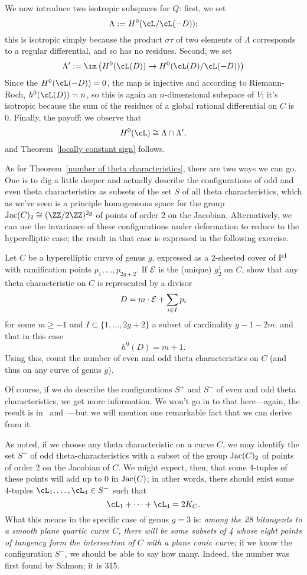 We now introduce two isotropic subspaces for $Q$: first, we set
$$
\Lambda := H^0( \cL / \cL(-D) );
$$
this is isotropic simply because the product $\sigma\tau$ of two elements of $\Lambda$ corresponds to a regular differential, and so has no residues. Second, we set
$$
\Lambda' := \im\left( H^0(\cL(D)) \to H^0( \cL(D) / \cL(-D) ) \right)
$$
Since the $H^0(\cL(-D)) = 0$, the map is injective and according to Riemann-Roch, $h^0(\cL(D)) = n$, so this is again an $n$-dimensional subspace of $V$; it's isotropic because the sum of the residues of a global rational differential on $C$ is 0. Finally, the payoff: we observe that
$$
H^0(\cL) \cong \Lambda \cap \Lambda',
$$
and Theorem~\ref{locally constant sign} follows.

As for Theorem~\ref{number of theta characteristics}, there are two ways we can go. One is to dig a little deeper and actually describe the configurations of odd and even theta characteristics as subsets of the set $S$ of all theta characteristics, which as we've seen is a principle homogeneous space for the group $\Jac(C)_2 \cong (\ZZ/2\ZZ)^{2g}$ of points of order 2 on the Jacobian. Alternatively, we can use the invariance of these configurations under deformation to reduce to the hyperelliptic case; the result in that case is expressed in the following exercise.

\begin{exercise}
Let $C$ be a hyperelliptic curve of genus $g$, expressed as a 2-sheeted cover of $\PP^1$ with ramification points $p_1,\dots,p_{2g+2}$. If $\cE$ is the (unique) $g^1_2$ on $C$, show that any theta characteristic on $C$ is represented by a divisor
$$
D = m\cdot \cE + \sum_{i \in I} p_i
$$
for some $m \geq -1$ and $I \subset \{1,\dots, 2g+2\}$ a subset of cardinality $g-1-2m$; and that in this case
$$
h^0(D) = m+1.
$$
Using this, count the number of even and odd theta characteristics on $C$ (and thus on any curve of genus $g$).
\end{exercise}

Of course, if we do describe the configurations $S^+$ and $S^-$ of even and odd theta characteristics, we get more information. We won't go in to that here---again, the result is in~\cite{MumfordPaper} and~\cite{JHPaper}---but we will mention one remarkable fact that we can derive from it.

As noted, if we choose any theta characteristic on a curve $C$, we may identify the set $S^-$ of odd theta-characteristics with a subset of the group $\Jac(C)_2$ of points of order 2 on the Jacobian of $C$. We might expect, then, that some 4-tuples of these points will add up to 0 in $\Jac(C)$; in other words, there should exist some 4-tuples $\cL_1,\dots,\cL_4 \in S^-$ such that
$$
\cL_1+ \dots +\cL_4 = 2K_C.
$$
What this means in the specific case of genus $g=3$ is: \emph{among the 28 bitangents to a smooth plane quartic curve $C$, there will be some subsets of 4 whose eight points of tangency form the intersection of $C$ with a plane conic curve}; if we know the configuration $S^-$, we should be able to say how many. Indeed, the number was first found by Salmon; it is 315.



